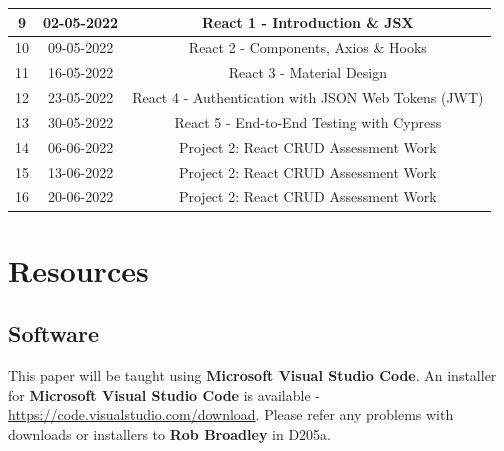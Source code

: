 \documentclass{article}
\begin{document}
\begin{tabular}{|c|c|c|c|}
	\footnotesize 9  & \footnotesize 02-05-2022 & \multicolumn{2}{c|}{\footnotesize React 1 - Introduction \& JSX}                                                                 \\ \hline
	\footnotesize 10 & \footnotesize 09-05-2022 & \multicolumn{2}{c|}{\footnotesize React 2 - Components, Axios \& Hooks}                                                          \\ \hline
	\footnotesize 11 & \footnotesize 16-05-2022 & \multicolumn{2}{c|}{\footnotesize React 3 - Material Design}                                                                          \\ \hline
	\footnotesize 12 & \footnotesize 23-05-2022 & \multicolumn{2}{c|}{\footnotesize React 4 - Authentication with JSON Web Tokens (JWT)}                                           \\ \hline
	\footnotesize 13 & \footnotesize 30-05-2022 & \multicolumn{2}{c|}{\footnotesize React 5 - End-to-End Testing with Cypress}                                                     \\ \hline
	\footnotesize 14 & \footnotesize 06-06-2022 & \multicolumn{2}{c|}{\footnotesize Project 2: React CRUD Assessment Work}                                                         \\ \hline
	\footnotesize 15 & \footnotesize 13-06-2022 & \multicolumn{2}{c|}{\footnotesize Project 2: React CRUD Assessment Work}                                                         \\ \hline
	\footnotesize 16 & \footnotesize 20-06-2022 & \multicolumn{2}{c|}{\footnotesize Project 2: React CRUD Assessment Work}                                                         \\ \hline
\end{tabular}

\section*{Resources}

\subsection*{Software}
This paper will be taught using \textbf{Microsoft Visual Studio Code}. An installer for \textbf{Microsoft Visual Studio Code} is available - \href{https://code.visualstudio.com/download}{https://code.visualstudio.com/download}. Please refer any problems with downloads or installers to \textbf{Rob Broadley} in D205a.
\end{document}
